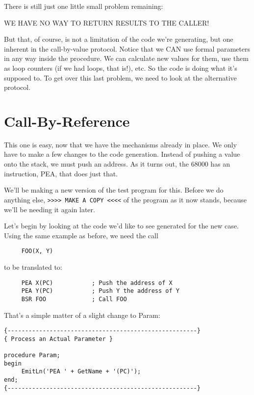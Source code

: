 There is still just one little small problem remaining:

WE HAVE NO WAY TO RETURN RESULTS TO THE CALLER!

But  that, of course, is not a  limitation  of  the  code  we're generating, but  one  inherent  in  the  call-by-value  protocol. Notice that we CAN use formal parameters in any  way  inside  the procedure. We  can  calculate  new  values for them, use them as loop counters (if we had loops, that is!), etc. So  the code is doing what it's supposed to. To  get over this last problem, we need to look at the alternative protocol.

\section{Call-By-Reference}

This  one is easy, now that we have  the  mechanisms  already  in place. We  only  have  to  make  a few  changes  to  the  code generation. Instead of  pushing  a value onto the stack, we must push an address. As it turns out, the 68000 has  an instruction, PEA, that does just that.

We'll be  making  a  new  version  of  the test program for this. Before we do anything else,
\verb|>>>> MAKE A COPY <<<<|
of  the program as it now stands, because  we'll  be  needing  it again later.

Let's begin by looking at the code we'd like to see generated for the new case. Using the same example as before, we need the call

\begin{verbatim}
     FOO(X, Y)
\end{verbatim}

to be translated to:

\begin{verbatim}
     PEA X(PC)           ; Push the address of X
     PEA Y(PC)           ; Push Y the address of Y
     BSR FOO             ; Call FOO
\end{verbatim}

That's a simple matter of a slight change to Param:

\begin{verbatim}
{------------------------------------------------------}
{ Process an Actual Parameter }

procedure Param;
begin
     EmitLn('PEA ' + GetName + '(PC)');
end;
{------------------------------------------------------}
\end{verbatim}

